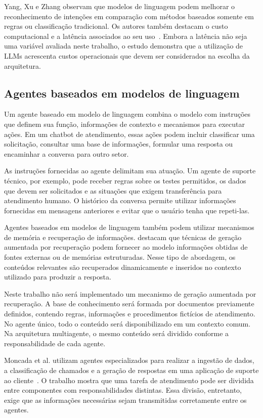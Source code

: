 Yang, Xu e Zhang observam que modelos de linguagem podem melhorar o reconhecimento de intenções em comparação com métodos baseados somente em regras ou classificação tradicional. Os autores também destacam o custo computacional e a latência associados ao seu uso~\cite{yang2025}. Embora a latência não seja uma variável avaliada neste trabalho, o estudo demonstra que a utilização de LLMs acrescenta custos operacionais que devem ser considerados na escolha da arquitetura.

\subsection{Agentes baseados em modelos de linguagem}
\label{subsec:agentes-llm}

Um agente baseado em modelo de linguagem combina o modelo com instruções que definem sua função, informações de contexto e mecanismos para executar ações. Em um chatbot de atendimento, essas ações podem incluir classificar uma solicitação, consultar uma base de informações, formular uma resposta ou encaminhar a conversa para outro setor.

As instruções fornecidas ao agente delimitam sua atuação. Um agente de suporte técnico, por exemplo, pode receber regras sobre os testes permitidos, os dados que devem ser solicitados e as situações que exigem transferência para atendimento humano. O histórico da conversa permite utilizar informações fornecidas em mensagens anteriores e evitar que o usuário tenha que repeti-las.

Agentes baseados em modelos de linguagem também podem utilizar mecanismos de memória e recuperação de informações. \textcite{yan2026} destacam que técnicas de geração aumentada por recuperação podem fornecer ao modelo informações obtidas de fontes externas ou de memórias estruturadas. Nesse tipo de abordagem, os conteúdos relevantes são recuperados dinamicamente e inseridos no contexto utilizado para produzir a resposta.

Neste trabalho não será implementado um mecanismo de geração aumentada por recuperação. A base de conhecimento será formada por documentos previamente definidos, contendo regras, informações e procedimentos fictícios de atendimento. No agente único, todo o conteúdo será disponibilizado em um contexto comum. Na arquitetura multiagente, o mesmo conteúdo será dividido conforme a responsabilidade de cada agente.

Moncada et al. utilizam agentes especializados para realizar a ingestão de dados, a classificação de chamados e a geração de respostas em uma aplicação de suporte ao cliente~\cite{moncada2025}. O trabalho mostra que uma tarefa de atendimento pode ser dividida entre componentes com responsabilidades distintas. Essa divisão, entretanto, exige que as informações necessárias sejam transmitidas corretamente entre os agentes.


